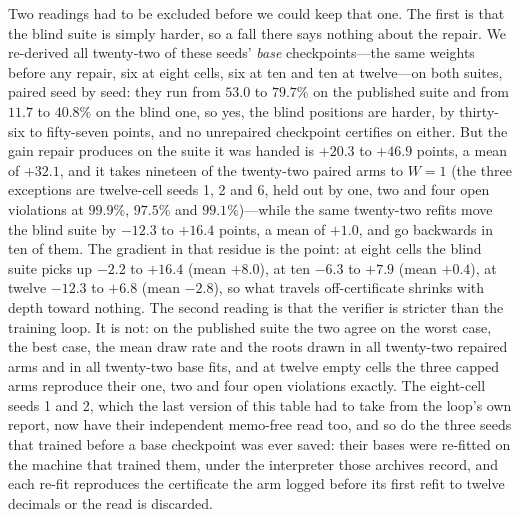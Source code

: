 \documentclass[conference]{IEEEtran}
\begin{document}
Two readings had to be excluded before we could keep that one. The first is that the blind suite is simply harder, so a fall there says nothing about the repair. We re-derived all twenty-two of these seeds' \emph{base} checkpoints---the same weights before any repair, six at eight cells, six at ten and ten at twelve---on both suites, paired seed by seed: they run from $53.0$ to $79.7\%$ on the published suite and from $11.7$ to $40.8\%$ on the blind one, so yes, the blind positions are harder, by thirty-six to fifty-seven points, and no unrepaired checkpoint certifies on either. But the gain repair produces on the suite it was handed is $+20.3$ to $+46.9$ points, a mean of $+32.1$, and it takes nineteen of the twenty-two paired arms to $W=1$ (the three exceptions are twelve-cell seeds 1, 2 and 6, held out by one, two and four open violations at $99.9\%$, $97.5\%$ and $99.1\%$)---while the same twenty-two refits move the blind suite by $-12.3$ to $+16.4$ points, a mean of $+1.0$, and go backwards in ten of them. The gradient in that residue is the point: at eight cells the blind suite picks up $-2.2$ to $+16.4$ (mean $+8.0$), at ten $-6.3$ to $+7.9$ (mean $+0.4$), at twelve $-12.3$ to $+6.8$ (mean $-2.8$), so what travels off-certificate shrinks with depth toward nothing. The second reading is that the verifier is stricter than the training loop. It is not: on the published suite the two agree on the worst case, the best case, the mean draw rate and the roots drawn in all twenty-two repaired arms and in all twenty-two base fits, and at twelve empty cells the three capped arms reproduce their one, two and four open violations exactly. The eight-cell seeds 1 and 2, which the last version of this table had to take from the loop's own report, now have their independent memo-free read too, and so do the three seeds that trained before a base checkpoint was ever saved: their bases were re-fitted on the machine that trained them, under the interpreter those archives record, and each re-fit reproduces the certificate the arm logged before its first refit to twelve decimals or the read is discarded.
\end{document}
